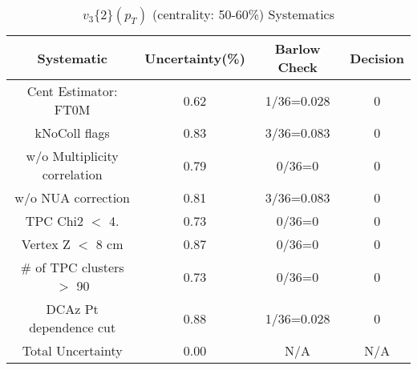 \begin{table}[htbp]
\caption{$v_3\{2\}(p_{T})$ (centrality: 50-60\%) Systematics}
\label{tab:Sys_pTDiffv3}
\centering
\begin{tabular}{|c|c|c|c|}
\hline
Systematic & Uncertainty(\%) & Barlow Check & Decision \\
\hline
Cent Estimator: FT0M & 0.62 & 1/36=0.028 & 0 \\
kNoColl flags & 0.83 & 3/36=0.083 & 0 \\
w/o Multiplicity correlation & 0.79 & 0/36=0 & 0 \\
w/o NUA correction & 0.81 & 3/36=0.083 & 0 \\
TPC Chi2 $<$ 4. & 0.73 & 0/36=0 & 0 \\
Vertex Z $<$ 8 cm & 0.87 & 0/36=0 & 0 \\
\# of TPC clusters $>$ 90 & 0.73 & 0/36=0 & 0 \\
DCAz Pt dependence cut & 0.88 & 1/36=0.028 & 0 \\
\hline
Total Uncertainty & 0.00 & N/A & N/A \\
\hline
\end{tabular}
\end{table}
